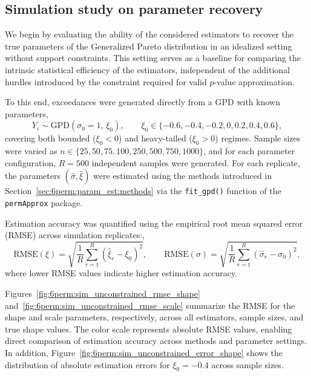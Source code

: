 \subsection{Simulation study on parameter recovery}
\label{sec:6perm:param_est:sim_unconstrained}

We begin by evaluating the ability of the considered estimators to recover the true parameters of the Generalized Pareto distribution in an idealized setting without support constraints. 
This setting serves as a baseline for comparing the intrinsic statistical efficiency of the estimators, independent of the additional hurdles introduced by the constraint required for valid $p$-value approximation.

To this end, exceedances were generated directly from a GPD with known parameters,
\begin{equation}
Y_i \sim \mathrm{GPD}(\sigma_0 = 1,\, \xi_0),
\qquad
\xi_0 \in \{-0.6, -0.4, -0.2, 0, 0.2, 0.4, 0.6\},
\end{equation}
covering both bounded ($\xi_0 < 0$) and heavy-tailed ($\xi_0 > 0$) regimes. 
Sample sizes were varied as
$n \in \{25, 50, 75, 100, 250, 500, 750, 1000\}$,
and for each parameter configuration, $R = 500$ independent samples were generated. 
For each replicate, the parameters $(\hat{\sigma}, \hat{\xi})$ were estimated using the methods introduced in Section~\ref{sec:6perm:param_est:methods} via the \texttt{fit\_gpd()} function of the \texttt{permApprox} package.

Estimation accuracy was quantified using the empirical root mean squared error (RMSE) across simulation replicates:,
\begin{equation}
\mathrm{RMSE}(\xi) = 
\sqrt{\frac{1}{R}\sum_{r=1}^{R}(\hat{\xi}_r - \xi_0)^2},
\qquad
\mathrm{RMSE}(\sigma) = 
\sqrt{\frac{1}{R}\sum_{r=1}^{R}(\hat{\sigma}_r - \sigma_0)^2},
\end{equation}
where lower RMSE values indicate higher estimation accuracy.

Figures~\ref{fig:6perm:sim_unconstrained_rmse_shape} and~\ref{fig:6perm:sim_unconstrained_rmse_scale} summarize the RMSE for the shape and scale parameters, respectively, across all estimators, sample sizes, and true shape values. 
The color scale represents absolute RMSE values, enabling direct comparison of estimation accuracy across methods and parameter settings. 
In addition, Figure~\ref{fig:6perm:sim_unconstrained_error_shape} shows the distribution of absolute estimation errors for $\xi_0 = -0.4$ across sample sizes.

